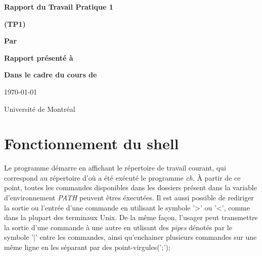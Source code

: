 \documentclass[letterpaper,12pt]{scrartcl}
\begin{document}
	\begin{center}
		\vspace{2cm}

		{\Huge\bf\sf Rapport du Travail Pratique 1}

		\vspace{0.5cm}

		{\bf\sf (TP1)}

		\vspace{4cm}

		{\bf\sf Par}

		\vspace{0.5cm}{\large\bf\sf Charles Langlois et François Poitras}

		\vspace{2cm}

		{\bf\sf Rapport présenté à}

		\vspace{0.5cm}{\large\bf\sf M. Stefan Monnier}

		\vspace{2cm}

		{\bf\sf Dans le cadre du cours de}

		\vspace{0.5cm}{\large\bf\sf Systèmes d'exploitation (IFT2245)}

		\vspace{\fill}
		\today

		\vspace{0.5cm}Université de Montréal
	\end{center}
	
	\newpage

	\pagestyle{cb}
	
	\tableofcontents

	\newpage

	\section{Fonctionnement du shell}
			Le programme démarre en affichant le répertoire de travail courant, qui correspond au répertoire d'où a été exécuté le programme \textit{ch}. À partir de ce point, toutes les commandes disponibles dans les dossiers présent dans la variable d'environnement \textit{PATH} peuvent êtres éxecutées. Il est aussi possible de rediriger la sortie ou l'entrée d'une commande en utilisant le symbole '>' ou '<', comme dans la plupart des terminaux Unix. De la même façon, l'usager peut transmettre la sortie d'une commande à une autre en utlisant des \textit{pipes} dénotés par le symbole '|' entre les commandes, ainsi qu'enchainer plusieurs commandes sur une même ligne en les séparant par des point-virgules(';'); 
\end{document}

